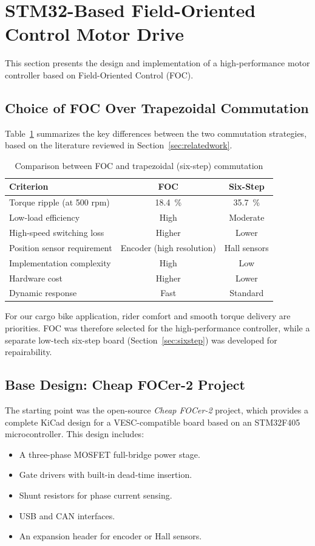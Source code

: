 \section{STM32-Based Field-Oriented Control Motor Drive}
\label{sec:foc}

This section presents the design and implementation of a high-performance motor controller based on Field-Oriented Control (FOC).

\subsection{Choice of FOC Over Trapezoidal Commutation}

Table~\ref{tab:foc_vs_trap} summarizes the key differences between the two commutation strategies, based on the literature reviewed in Section~\ref{sec:relatedwork}.

\begin{table}[htbp]
\caption{Comparison between FOC and trapezoidal (six-step) commutation}
\label{tab:foc_vs_trap}
\centering
\begin{tabular}{lcc}
\toprule
\textbf{Criterion} & \textbf{FOC} & \textbf{Six-Step} \\
\midrule
Torque ripple (at 500 rpm) & \SI{18.4}{\percent} & \SI{35.7}{\percent} \\
Low-load efficiency & High & Moderate \\
High-speed switching loss & Higher & Lower \\
Position sensor requirement & Encoder (high resolution) & Hall sensors \\
Implementation complexity & High & Low \\
Hardware cost & Higher & Lower \\
Dynamic response & Fast & Standard \\
\bottomrule
\end{tabular}
\end{table}

For our cargo bike application, rider comfort and smooth torque delivery are priorities. FOC was therefore selected for the high-performance controller, while a separate low-tech six-step board (Section~\ref{sec:sixstep}) was developed for repairability.

\subsection{Base Design: Cheap FOCer-2 Project}

The starting point was the open-source \textit{Cheap FOCer-2} project, which provides a complete KiCad design for a VESC-compatible board based on an STM32F405 microcontroller. This design includes:
\begin{itemize}
    \item A three-phase MOSFET full-bridge power stage.
    \item Gate drivers with built-in dead-time insertion.
    \item Shunt resistors for phase current sensing.
    \item USB and CAN interfaces.
    \item An expansion header for encoder or Hall sensors.
\end{itemize}

